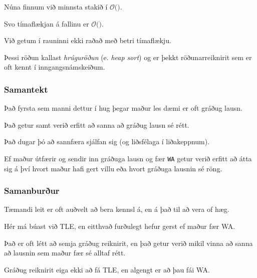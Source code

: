 {
}

{
	{
		\item<1-> Núna finnum við minnsta stakið í $\mathcal{O}($\onslide<2->{$\log n$}$)$.
		\item<3-> Svo tímaflækjan á fallinu er $\mathcal{O}($\onslide<4->{$n \log n$}$)$.
		\item<5-> Við getum í rauninni ekki raðað með betri tímaflækju.
		\item<6-> Þessi röðun kallast \emph{hrúguröðun} (e. \emph{heap sort}) og er þekkt röðunarreiknirit sem er oft kennt í inngangsnámskeiðum.
	}
}

{
	\frametitle{Samantekt}
	{
		\item<1-> Það fyrsta sem manni dettur í hug þegar maður les dæmi er oft gráðug lausn.
		\item<2-> Það getur samt verið erfitt að sanna að gráðug lausn sé rétt.
		\item<3-> Það dugar þó að sannfæra sjálfan sig (og liðsfélaga í liðakeppnum).
		\item<4-> Ef maður útfærir og sendir inn gráðuga lausn og fær \texttt{WA}
					getur verið erfitt að átta sig á því hvort maður hafi gert villu eða hvort gráðuga lausnin sé röng.
	}
}

{
	\frametitle{Samanburður}
	{
		\item<1-> Tæmandi leit er oft auðvelt að bera kennsl á, en á það til að vera of hæg. 
		\item<2-> Hér má búast við TLE, en eitthvað furðulegt hefur gerst ef maður fær WA.
		\item<3-> Það er oft létt að semja gráðug reiknirit, en það getur verið mikil vinna að sanna að lausnin sem maður fær sé alltaf rétt.
		\item<4-> Gráðug reiknirit eiga ekki að fá TLE, en algengt er að þau fái WA.
	}
}

{
}


